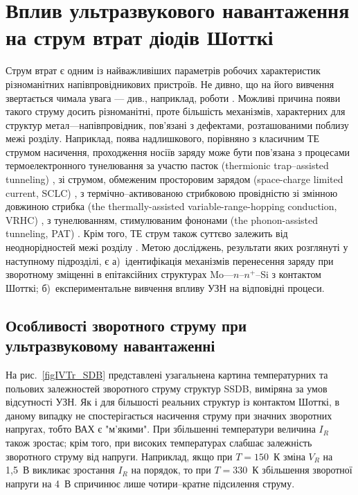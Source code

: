 \section{Вплив ультразвукового навантаження на струм втрат діодів Шотткі\label{SSDB:Rev}}

Струм втрат є одним із найважливіших параметрів робочих характеристик різноманітних напівпровідникових пристроїв.
Не дивно, що на його вивчення звертається чимала увага --- див., наприклад, роботи \cite{Sathaiya,VRH:Shan,Pipinys2006,Referi1,Referi2}.
Можливі причина появи такого струму досить різноманітні, проте більшість механізмів, характерних для структур метал---напівпровідник,
пов'язані з дефектами, розташованими поблизу межі розділу.
Наприклад, поява надлишкового, порівняно з класичним ТЕ струмом насичення, проходження носіїв заряду може
бути пов'язана
з процесами термоелектронного тунелювання за участю пасток (thermionic trap--assisted tunneling) \cite{Sathaiya},
зі струмом, обмеженим просторовим зарядом (space-charge limited current, SCLC) \cite{Abu-Samaha,Jafar},
з термічно--активованою стрибковою провідністю зі змінною довжиною стрибка (the thermally-assisted variable-range-hopping conduction, VRHC) \cite{Jafar,VRH:Lee,VRH:Shan},
з тунелюванням, стимулюваним фононами (the phonon-assisted tunneling, PAT) \cite{Pipinys1999,Pipinys2006}.
Крім того, ТЕ струм також суттєво залежить від неоднорідностей межі розділу  \cite{Tung:MSE}.
Метою досліджень, результати яких розглянуті у наступному підрозділі, є
а)~ідентифікація механізмів перенесення заряду при зворотному зміщенні в епітаксійних структурах Mo---$n$--$n^+$--Si з контактом Шотткі;
б)~експериментальне вивчення впливу УЗН на відповідні процеси.

\subsection{Особливості зворотного струму при ультразвуковому навантаженні}

На рис.~\ref{figIVTr_SDB} представлені узагальнена картина температурних та польових залежностей зворотного струму структур SSDB,
виміряна за умов відсутності УЗН.
Як і для більшості реальних структур із контактом Шотткі, в даному випадку не спостерігається насичення струму при
значних зворотних напругах, тобто ВАХ є "м'якими".
При збільшенні температури величина $I_R$ також зростає;
крім того, при високих температурах слабшає залежність зворотного струму від напруги.
Наприклад, якщо при $T=150$~К зміна $V_R$ на 1,5~В викликає зростання $I_R$ на порядок,
то при $T=330$~К збільшення зворотної напруги на 4~В спричинює лише чотири--кратне підсилення струму.

